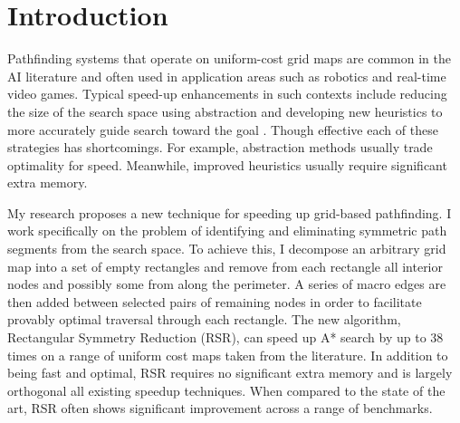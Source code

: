 \section{Introduction}
\label{sec:introduction}
Pathfinding systems that operate on uniform-cost grid maps are common in the AI
literature and often used in
application areas such as robotics and real-time
video games.  Typical speed-up enhancements in such contexts include reducing
the size of the search space using abstraction \cite{botea04} and developing new
heuristics to more accurately guide search toward the goal \cite{sturtevant09}.
Though effective each of these strategies has shortcomings.  For example,
abstraction methods usually trade optimality for speed.  Meanwhile, improved
heuristics usually require significant extra memory.
\par 
My research proposes a new technique for speeding up grid-based pathfinding.  I
work specifically on the problem of identifying and eliminating symmetric path
segments from the search space.  To achieve this, I decompose an arbitrary grid
map into a set of empty rectangles and remove from each rectangle all interior
nodes and possibly some from along the perimeter.  A series of macro edges are
then added between selected pairs of remaining nodes in order to facilitate
provably optimal traversal through each rectangle.  The new algorithm,
Rectangular Symmetry Reduction (RSR), can speed up A* search by up to 38
times on a range of uniform cost maps taken from the literature.  In addition to
being fast and optimal, RSR requires no significant extra memory and is largely
orthogonal all existing speedup techniques.  When compared to the state of the
art, RSR often shows significant improvement across a range of benchmarks.
